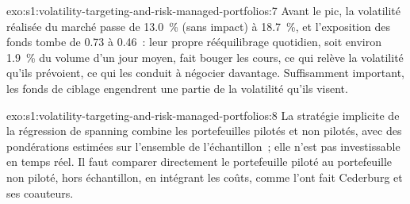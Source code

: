\begin{solution}{exo:s1:volatility-targeting-and-risk-managed-portfolios:7}
Avant le pic, la volatilité réalisée du marché passe de 13.0~\% (sans impact) à 18.7~\%, et l'exposition des fonds tombe de 0.73 à 0.46~: leur propre
rééquilibrage quotidien, soit environ 1.9~\% du volume d'un jour moyen, fait bouger les cours, ce qui relève la volatilité qu'ils prévoient, ce qui les conduit à négocier davantage. Suffisamment
important, les fonds de ciblage engendrent une partie de la volatilité qu'ils visent.
\end{solution}

\begin{solution}{exo:s1:volatility-targeting-and-risk-managed-portfolios:8}
La stratégie implicite de la régression de spanning combine les portefeuilles pilotés et non pilotés, avec des pondérations estimées sur l'ensemble de l'échantillon~; elle n'est pas
investissable en temps réel. Il faut comparer directement le portefeuille piloté au portefeuille non piloté, hors échantillon, en intégrant les coûts, comme l'ont fait Cederburg et ses coauteurs.
\end{solution}

